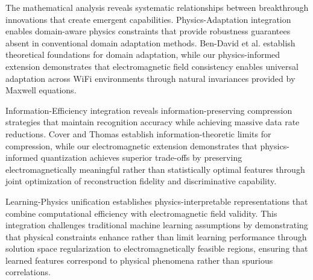 \documentclass[journal]{IEEEtran}
\begin{document}
The mathematical analysis reveals systematic relationships between breakthrough innovations that create emergent capabilities. Physics-Adaptation integration enables domain-aware physics constraints that provide robustness guarantees absent in conventional domain adaptation methods. Ben-David et al. \cite{ben2010theory} establish theoretical foundations for domain adaptation, while our physics-informed extension demonstrates that electromagnetic field consistency enables universal adaptation across WiFi environments through natural invariances provided by Maxwell equations.

Information-Efficiency integration reveals information-preserving compression strategies that maintain recognition accuracy while achieving massive data rate reductions. Cover and Thomas \cite{cover1999elements} establish information-theoretic limits for compression, while our electromagnetic extension demonstrates that physics-informed quantization achieves superior trade-offs by preserving electromagnetically meaningful rather than statistically optimal features through joint optimization of reconstruction fidelity and discriminative capability.

Learning-Physics unification establishes physics-interpretable representations that combine computational efficiency with electromagnetic field validity. This integration challenges traditional machine learning assumptions by demonstrating that physical constraints enhance rather than limit learning performance through solution space regularization to electromagnetically feasible regions, ensuring that learned features correspond to physical phenomena rather than spurious correlations.
\end{document}
